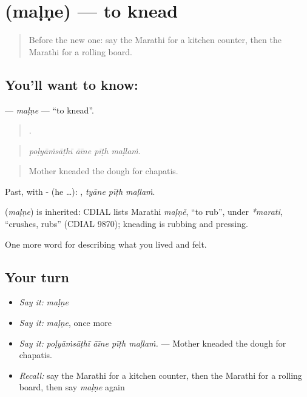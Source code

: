 \section[\texorpdfstring{\mr{मळणे} (maḷṇe)}{मळणे (maḷṇe)}]{ (maḷṇe) — to knead}

\label{lesson:MR-C526-malne}



\begin{quote}
Before the new one: say the Marathi for a kitchen counter, then the Marathi for a rolling board.
\end{quote}

\subsection*{You'll want to know: }
\textbf{} — \emph{maḷṇe} — \textquotedblleft{}to knead\textquotedblright{}.

\begin{quote}
   .
\end{quote}

\begin{quote}
\emph{poḷyāṁsāṭhī āīne pīṭh maḷlaṁ.}
\end{quote}

\begin{quote}
Mother kneaded the dough for chapatis.
\end{quote}

Past, with - (he …):   , \emph{tyāne pīṭh maḷlaṁ}.

\begin{cousinweb}
\textbf{} (\emph{maḷṇe}) is inherited: CDIAL lists Marathi \emph{maḷṇẽ}, \textquotedblleft{}to rub\textquotedblright{}, under \emph{*marati}, \textquotedblleft{}crushes, rubs\textquotedblright{} (CDIAL 9870); kneading is rubbing and pressing.
\end{cousinweb}

\begin{grammarlens}[title={What you've built}]
One more word for describing what you lived and felt.
\end{grammarlens}

\subsection*{Your turn}
\begin{itemize}
\raggedright
  \item \emph{Say it:} \emph{maḷṇe}
  \item \emph{Say it:} \emph{maḷṇe}, once more
  \item \emph{Say it:} \emph{poḷyāṁsāṭhī āīne pīṭh maḷlaṁ.} — Mother kneaded the dough for chapatis.
  \item \emph{Recall:} say the Marathi for a kitchen counter, then the Marathi for a rolling board, then say \emph{maḷṇe} again
\end{itemize}

